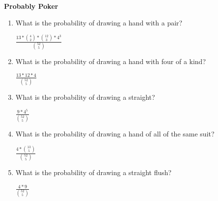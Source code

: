\question \textbf{Probably Poker}
\begin{enumerate}[label=(\alph*)]
\item What is the probability of drawing a hand with a pair?
\begin{solution}[2cm]
$ \frac{13 * {4 \choose 2} * {12 \choose 3} * 4^3}{{52 \choose 5}}$ 
\end{solution}
 
\item What is the probability of drawing a hand with four of a kind?
\begin{solution}[2cm]
$\frac{ 13 * 12 * 4}{{52 \choose 5}}$
 \end{solution}
 
\item What is the probability of drawing a straight? 
\begin{solution}[2cm]
$\frac{ 9 * 4^5}{{52 \choose 5}}$
 \end{solution}
 
\item What is the probability of drawing a hand of all of the same suit? 
\begin{solution}[2cm]
$\frac{4 * {13 \choose 5}}{{52 \choose 5}}$
 \end{solution}
 
\item What is the probability of drawing a straight flush? 
\begin{solution}[2cm]
$\frac{4 * 9}{{52 \choose 5}}$
 \end{solution}
\end{enumerate}